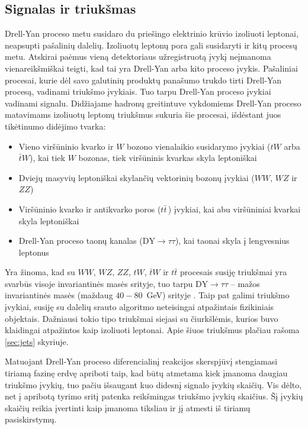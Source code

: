 \documentclass[a4paper, 12pt, oneside]{article}
\newcommand{\ZZ}{Z\! Z}
\newcommand{\WZ}{W\! Z}
\newcommand{\tbarW}{\bar{t}W}
\newcommand{\ttbar}{t\bar{t}}
\newcommand{\DYtau}{\mathrm{DY} \! \rightarrow \! \tau\tau}
\begin{document}
\subsection{Signalas ir triukšmas}\label{sec:sig_bkg}
Drell-Yan proceso metu susidaro du priešingo elektrinio krūvio izoliuoti leptonai, neapsupti pašalinių dalelių.
Izoliuotų leptonų pora gali susidaryti ir kitų procesų metu.
Atskirai paėmus vieną detektoriaus užregistruotą įvykį neįmanoma vienareikšmiškai teigti, kad tai yra Drell-Yan
arba kito proceso įvykis.
Pašaliniai procesai, kurie dėl savo galutinių produktų panašumo trukdo tirti Drell-Yan procesą, vadinami triukšmo įvykiais.
Tuo tarpu Drell-Yan proceso įvykiai vadinami signalu.
Didžiajame hadronų greitintuve vykdomiems Drell-Yan proceso matavimams izoliuotų leptonų triukšmus sukuria šie procesai,
išdėstant juos tikėtinumo didėjimo tvarka:
\begin{itemize}
	\item Vieno viršūninio kvarko ir $W$ bozono vienalaikio susidarymo įvykiai ($tW$ arba $\tbarW$), kai tiek $W$ bozonas,
	tiek viršūninis kvarkas skyla leptoniškai
	\item Dviejų masyvių leptoniškai skylančių vektorinių bozonų įvykiai ($WW$, $\WZ$ ir $\ZZ$)	
	\item Viršūninio kvarko ir antikvarko poros ($\ttbar\,$) įvykiai, kai abu viršūniniai kvarkai skyla leptoniškai
	\item Drell-Yan proceso taonų kanalas ($\DYtau$), kai taonai skyla į lengvesnius leptonus
\end{itemize}
Yra žinoma, kad su $WW$, $\WZ$, $\ZZ$, $tW$, $\tbarW$ ir $\ttbar$ procesais susiję triukšmai yra svarbūs visoje invariantinės
masės srityje, tuo tarpu $\DYtau$ -- mažos invariantinės masės (maždaug $40-80$~GeV) srityje
\cite{DY_CMS2011, DY_CMS2013, DY_CMS2015, DY_CMS2019}.
Taip pat galimi triukšmo įvykiai, susiję su dalelių srauto algoritmo neteisingai atpažintais fizikiniais objektais.
Dažniausi tokio tipo triukšmai siejasi su čiurkšlėmis, kurios buvo klaidingai atpažintos kaip izoliuoti leptonai.
Apie šiuos triukšmus plačiau rašoma \ref{sec:jets} skyriuje.

Matuojant Drell-Yan proceso diferencialinį reakcijos skerspjūvį stengiamasi tiriamą fazinę erdvę apriboti taip, kad būtų
atmetama kiek įmanoma daugiau triukšmo įvykių, tuo pačiu išsaugant kuo didesnį signalo įvykių skaičių.
Vis dėlto, net į apribotą tyrimo sritį patenka reikšmingas triukšmo įvykių skaičius.
Šį įvykių skaičių reikia įvertinti kaip įmanoma tiksliau ir jį atmesti iš tiriamų pasiskirstymų.
\end{document}
